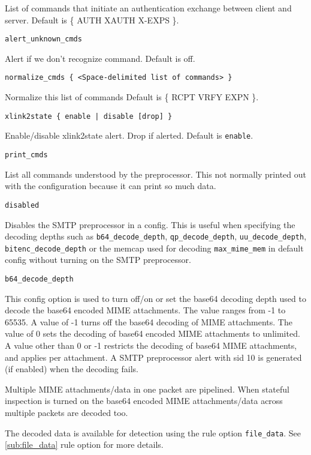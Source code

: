 \documentclass[english]{report}
\newcounter{slistnum}
\newenvironment{slist}
{ \begin{list}{ {\bf \arabic{slistnum}.} }{\usecounter{slistnum} } }
{ \end{list} }
\begin{document}
\begin{slist}
List of commands that initiate an authentication exchange between client
and server.  Default is \{ AUTH XAUTH X-EXPS \}.

\item \texttt{alert\_unknown\_cmds}

Alert if we don't recognize command.  Default is off.

\item \texttt{normalize\_cmds \{ <Space-delimited list of commands> \}}

Normalize this list of commands Default is \{ RCPT VRFY EXPN \}.

\item \texttt{xlink2state \{ enable | disable [drop] \}}

Enable/disable xlink2state alert.  Drop if alerted.  Default is
\texttt{enable}.

\item \texttt{print\_cmds}

List all commands understood by the preprocessor.  This not normally printed
out with the configuration because it can print so much data.

\item \texttt{disabled}

Disables the SMTP preprocessor in a config. This is useful when specifying
the decoding depths such as \texttt{b64\_decode\_depth}, \texttt{qp\_decode\_depth}, 
\texttt{uu\_decode\_depth}, \texttt{bitenc\_decode\_depth} or the memcap used for 
decoding \texttt{max\_mime\_mem} in default config without turning on the SMTP preprocessor.

\item \texttt{b64\_decode\_depth}

This config option is used to turn off/on or set the base64 decoding depth used to
decode the base64 encoded MIME attachments. The value ranges from -1 to 65535.
A value of -1 turns off the base64 decoding of MIME attachments. The value of 0
sets the decoding of base64 encoded MIME attachments to unlimited. A value other
than 0 or -1 restricts the decoding of base64 MIME attachments, and applies per attachment. 
A SMTP preprocessor alert with sid 10 is generated (if enabled) when the decoding fails.

Multiple MIME attachments/data in one packet are pipelined. When stateful inspection 
is turned on the base64 encoded MIME attachments/data across multiple packets are decoded too.

The decoded data is available for detection using the rule option \texttt{file\_data}. 
See \ref{sub:file_data} rule option for more details.


\end{slist}
\end{document}
